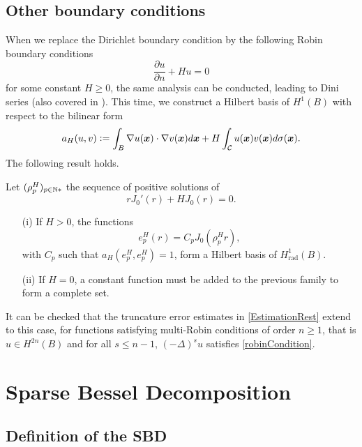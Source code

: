 \documentclass[smallextended]{svjour3}
\begin{document}
\subsection{Other boundary conditions}
\label{Robin}
When we replace the Dirichlet boundary condition by the following Robin boundary conditions
\begin{equation}
	\label{robinCondition}
	\dfrac{\partial u}{\partial n} + H u = 0
\end{equation}
for some constant $H \geq 0$, the same analysis can be conducted, leading to Dini series (also covered in \cite{watson1995treatise}). This time, we construct a Hilbert basis of $H^1(B)$ with respect to the bilinear form
\[a_H(u,v) \mathrel{\mathop:}= \int_{B} \nabla u(\boldsymbol{x} ) \cdot \nabla v(\boldsymbol{x} ) d\boldsymbol{x} + H \int_{\mathcal{C}}{u(\boldsymbol{x} )v(\boldsymbol{x} )}d\sigma(\boldsymbol{x} ).\]
The following result holds. 
\begin{theorem}
	Let $(\rho_p^H)_{p \in \mathbb{N}*}$ the sequence of positive solutions of
	\[r J_0'(r) + H J_0(r) = 0.\]
	\begin{itemize}
		\item[(i)] If $H>0$, the functions 
		\[e_p^H(r) = C_p J_0(\rho_p^H r),\]
		with $C_p$ such that $a_H(e_p^H,e_p^H) = 1$, form a Hilbert basis of $H^1_{\text{rad}}(B)$. 
		\item[(ii)]If $H = 0$, a constant function must be added to the previous family to form a complete set. 
	\end{itemize}
\end{theorem}
\noindent It can be checked that the truncature error estimates in \autoref{EstimationRest} extend to this case, for functions satisfying multi-Robin conditions of order $n \geq 1$, that is  $u \in H^{2n}(B)$ and for all $s\leq n-1$, $(-\Delta)^s u$ satisfies \eqref{robinCondition}.
										
										
\section{Sparse Bessel Decomposition}

\label{sec:SBD}
\subsection{Definition of the SBD}
										
\end{document}
